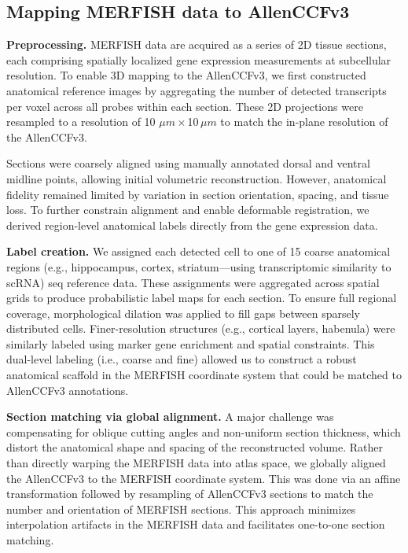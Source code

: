 \documentclass[
  12pt,
]{article}
\begin{document}
\subsection{Mapping MERFISH data to
AllenCCFv3}\label{mapping-merfish-data-to-allenccfv3}

\textbf{Preprocessing.} MERFISH data are acquired as a series of 2D
tissue sections, each comprising spatially localized gene expression
measurements at subcellular resolution. To enable 3D mapping to the
AllenCCFv3, we first constructed anatomical reference images by
aggregating the number of detected transcripts per voxel across all
probes within each section. These 2D projections were resampled to a
resolution of 10 \(\mu m\)\,\(\times\)\,10\,\(\mu m\) to match the
in-plane resolution of the AllenCCFv3.

Sections were coarsely aligned using manually annotated dorsal and
ventral midline points, allowing initial volumetric reconstruction.
However, anatomical fidelity remained limited by variation in section
orientation, spacing, and tissue loss. To further constrain alignment
and enable deformable registration, we derived region-level anatomical
labels directly from the gene expression data.

\textbf{Label creation.} We assigned each detected cell to one of 15
coarse anatomical regions (e.g., hippocampus, cortex, striatum---using
transcriptomic similarity to scRNA) seq reference data. These
assignments were aggregated across spatial grids to produce
probabilistic label maps for each section. To ensure full regional
coverage, morphological dilation was applied to fill gaps between
sparsely distributed cells. Finer-resolution structures (e.g., cortical
layers, habenula) were similarly labeled using marker gene enrichment
and spatial constraints. This dual-level labeling (i.e., coarse and
fine) allowed us to construct a robust anatomical scaffold in the
MERFISH coordinate system that could be matched to AllenCCFv3
annotations.

\textbf{Section matching via global alignment.} A major challenge was
compensating for oblique cutting angles and non-uniform section
thickness, which distort the anatomical shape and spacing of the
reconstructed volume. Rather than directly warping the MERFISH data into
atlas space, we globally aligned the AllenCCFv3 to the MERFISH
coordinate system. This was done via an affine transformation followed
by resampling of AllenCCFv3 sections to match the number and orientation
of MERFISH sections. This approach minimizes interpolation artifacts in
the MERFISH data and facilitates one-to-one section matching.
\end{document}
